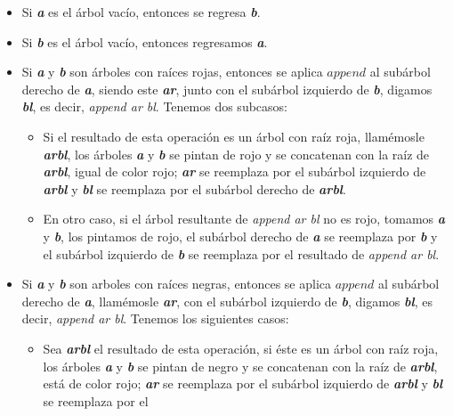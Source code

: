 \begin{itemize}
    \item Si \textbf{\textit{a}} es el \'arbol vacío, entonces se regresa \textbf{\textit{b}}.
    \item Si \textbf{\textit{b}} es el \'arbol vacío, entonces regresamos \textbf{\textit{a}}.
    \item Si \textbf{\textit{a}} y \textbf{\textit{b}} son \'arboles con raíces rojas, entonces se 
    aplica \hyperref[func_app]{$append$} al subárbol derecho de \textbf{\textit{a}}, siendo este \textbf{\textit{ar}}, 
    junto con el subárbol izquierdo de \textbf{\textit{b}}, digamos \textbf{\textit{bl}}, es decir, 
    \textit{append ar bl}. Tenemos dos subcasos:
    \begin{itemize}
      \item Si el resultado de esta operación es un árbol con raíz roja, llam\'emosle \textbf{\textit{arbl}},
      los \'arboles \textbf{\textit{a}} y \textbf{\textit{b}} se pintan de rojo y se concatenan con 
      la raíz de \textbf{\textit{arbl}}, igual de color rojo; \textbf{\textit{ar}} se reemplaza por 
      el subárbol izquierdo de \textbf{\textit{arbl}} y \textbf{\textit{bl}} se reemplaza por el
      subárbol derecho de \textbf{\textit{arbl}}.
      \item En otro caso, si el \'arbol resultante de \textit{append ar bl} no es rojo, tomamos 
      \textbf{\textit{a}} y \textbf{\textit{b}}, los pintamos de rojo, el subárbol derecho de
      \textbf{\textit{a}} se reemplaza por \textbf{\textit{b}} y el subárbol izquierdo de 
      \textbf{\textit{b}} se reemplaza por el resultado de \textit{append ar bl}.
    \end{itemize}
    \item Si \textbf{\textit{a}} y \textbf{\textit{b}} son arboles con raíces negras, entonces se 
    aplica \hyperref[func_app]{$append$} al subárbol derecho de \textbf{\textit{a}}, llam\'emosle \textbf{\textit{ar}}, con el
    subárbol izquierdo de \textbf{\textit{b}}, digamos \textbf{\textit{bl}}, es decir, \textit{append
    ar bl}. Tenemos los siguientes casos:
    \begin{itemize}
      \item Sea \textbf{\textit{arbl}} el resultado de esta operación, si \'este es un árbol con raíz roja,
      los \'arboles \textbf{\textit{a}} y \textbf{\textit{b}} se pintan de negro y se concatenan con
      la raíz de \textbf{\textit{arbl}}, est\'a de color rojo; \textbf{\textit{ar}} se reemplaza por 
      el subárbol izquierdo de \textbf{\textit{arbl}} y \textbf{\textit{bl}} se reemplaza por el 

\end{itemize}
\end{itemize}
